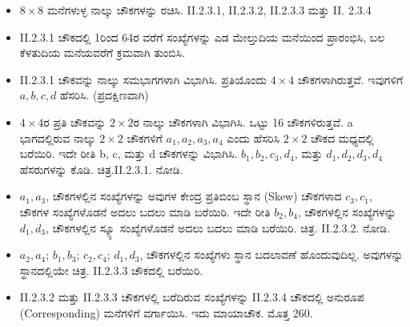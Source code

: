 \begin{itemize}
	\item $8 \times 8$ ಮನೆಗಳುಳ್ಳ ನಾಲ್ಕು ಚೌಕಗಳನ್ನು ರಚಿಸಿ. II.2.3.1, II.2.3.2, II.2.3.3 ಮತ್ತು II. 2.3.4\medskip
	\item II.2.3.1 ಚೌಕದಲ್ಲಿ 1ರಿಂದ 64ರ ವರೆಗೆ ಸಂಖ್ಯೆಗಳನ್ನು ಎಡ ಮೇಲ್ತುದಿಯ ಮನೆಯಿಂದ ಪ್ರಾರಂಭಿಸಿ, ಬಲ ಕೆಳತುದಿಯ ಮನೆಯವರೆಗೆ ಕ್ರಮವಾಗಿ ತುಂಬಿಸಿ.\medskip
	\item II.2.3.1 ಚೌಕವನ್ನು ನಾಲ್ಕು ಸಮಭಾಗಗಳಾಗಿ ವಿಭಾಗಿಸಿ. ಪ್ರತಿಯೊಂದು $4 \times 4$ ಚೌಕಗಳಾಗಿರುತ್ತವೆ. ಇವುಗಳಿಗೆ $a, b, c, d$ ಹೆಸರಿಸಿ. (ಪ್ರದಕ್ಷಿಣವಾಗಿ)\medskip
	\item $4 \times 4$ರ ಪ್ರತಿ ಚೌಕವನ್ನು $2 \times 2$ರ ನಾಲ್ಕು ಚೌಕಗಳಾಗಿ ವಿಭಾಗಿಸಿ. ಒಟ್ಟು 16 ಚೌಕಗಳಿರುತ್ತವೆ. a ಭಾಗದಲ್ಲಿರುವ ನಾಲ್ಕು $2 \times 2$ ಚೌಕಗಳಿಗೆ $a_1, a_2, a_3, a_4$ ಎಂದು ಹೆಸರಿಸಿ $2 \times 2$ ಚೌಕದ ಮಧ್ಯದಲ್ಲಿ ಬರೆಯಿರಿ. ಇದೇ ರೀತಿ b, c, ಮತ್ತು d ಚೌಕಗಳನ್ನು ವಿಭಾಗಿಸಿ. $b_1, b_2, c_3, d_4$, ಮತ್ತು $d_1, d_2, d_3, d_4$ ಹೆಸರುಗಳನ್ನು ಕೊಡಿ. ಚಿತ್ರ.II.2.3.1. ನೋಡಿ.\medskip
	\item $a_1, a_3$, ಚೌಕಗಳಲ್ಲಿನ ಸಂಖ್ಯೆಗಳನ್ನು ಅವುಗಳ ಕೇಂದ್ರ ಪ್ರತಿಬಿಂಬ ಸ್ಥಾನ (Skew) ಚೌಕಗಳಾದ $c_3, c_1$, ಚೌಕಗಳ ಸಂಖ್ಯೆಗಳೊಡನೆ ಅದಲು ಬದಲು ಮಾಡಿ ಬರೆ\-ಯಿರಿ. ಇದೇ ರೀತಿ $b_2, b_4$, ಚೌಕಗಳಲ್ಲಿನ ಸಂಖ್ಯೆಗಳನ್ನು $d_1, d_3$, ಚೌಕಗಳಲ್ಲಿನ ಸ್ಕ್ಯೂ  ಸಂಖ್ಯೆ\-ಗಳೊಡನೆ ಅದಲು ಬದಲು ಮಾಡಿ ಬರೆಯಿರಿ. ಚಿತ್ರ. II.2.3.2. ನೋಡಿ.\medskip
	\item $a_2, a_4$; $b_1, b_3$; $c_2, c_4$; $d_1, d_3$, ಚೌಕಗಳಲ್ಲಿನ ಸಂಖ್ಯೆಗಳು ಸ್ಥಾನ ಬದ\-ಲಾವಣೆ ಹೊಂದುವುದಿಲ್ಲ. ಅವುಗಳನ್ನು ಸ್ಥಾನದಲ್ಲಿಯೇ ಚಿತ್ರ. II.2.3.3 ಚೌಕದಲ್ಲಿ \hbox{ಬರೆಯಿರಿ.}\medskip
	\item II.2.3.2 ಮತ್ತು II.2.3.3 ಚೌಕಗಳಲ್ಲಿ ಬರೆದಿರುವ ಸಂಖ್ಯೆಗಳನ್ನು II.2.3.4 ಚೌಕದಲ್ಲಿ ಅನುರೂಪ (Corresponding) ಮನೆಗಳಿಗೆ ವರ್ಗಾಯಿಸಿ. ಇದು ಮಾಯಾಚೌಕ. ಮೊತ್ತ 260.
\end{itemize}

